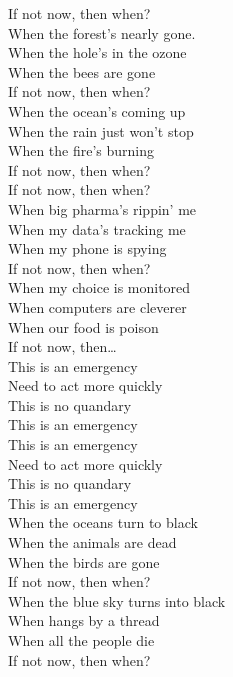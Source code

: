 \label{album:lw}




If not now, then when? \\
When the forest's nearly gone.\\
When the hole's in the ozone \\
When the bees are gone \\
If not now, then when? \\
When the ocean's coming up \\
When the rain just won't stop \\
When the fire's burning \\
If not now, then when? \\

If not now, then when? \\
When big pharma's rippin' me \\
When my data's tracking me \\
When my phone is spying \\
If not now, then when? \\
When my choice is monitored \\
When computers are cleverer \\
When our food is poison \\
If not now, then… \\

This is an emergency \\
Need to act more quickly \\
This is no quandary \\
This is an emergency \\

This is an emergency \\
Need to act more quickly \\
This is no quandary \\
This is an emergency \\

When the oceans turn to black \\
When the animals are dead \\
When the birds are gone \\
If not now, then when? \\
When the blue sky turns into black \\
When  hangs by a thread \\
When all the people die \\
If not now, then when? \\

